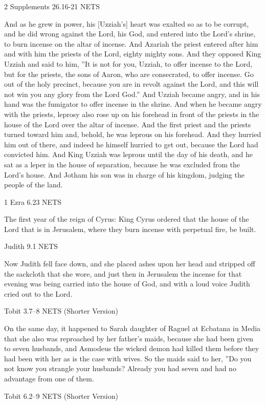 \documentclass[
]{article}
\newcommand{\RL}[1]{\beginR #1\endR}
\begin{document}
2 Supplements 26.16-21 NETS

And as he grew in power, his {[}Uzziah's{]} heart was exalted so as to
be corrupt, and he did wrong against the Lord, his God, and entered into
the Lord\RL{'}s shrine, to burn incense on the altar of incense. And
Azariah the priest entered after him and with him the priests of the
Lord, eighty mighty sons. And they opposed King Uzziah and said to him,
\RL{''}It is not for you, Uzziah, to offer incense to the Lord, but for
the priests, the sons of Aaron, who are consecrated, to offer incense.
Go out of the holy precinct, because you are in revolt against the Lord,
and this will not win you any glory from the Lord God.'' And Uzziah
became angry, and in his hand was the fumigator to offer incense in the
shrine. And when he became angry with the priests, leprosy also rose up
on his forehead in front of the priests in the house of the Lord over
the altar of incense. And the first priest and the priests turned toward
him and, behold, he was leprous on his forehead. And they hurried him
out of there, and indeed he himself hurried to get out, because the Lord
had convicted him. And King Uzziah was leprous until the day of his
death, and he sat as a leper in the house of separation, because he was
excluded from the Lord\RL{'}s house. And Jotham his son was in charge of
his kingdom, judging the people of the land.

1 Ezra 6.23 NETS

The first year of the reign of Cyrus: King Cyrus ordered that the house
of the Lord that is in Jerusalem, where they burn incense with perpetual
fire, be built.

Judith 9.1 NETS

Now Judith fell face down, and she placed ashes upon her head and
stripped off the sackcloth that she wore, and just then in Jerusalem the
incense for that evening was being carried into the house of God, and
with a loud voice Judith cried out to the Lord.

Tobit 3.7--8 NETS (Shorter Version)

On the same day, it happened to Sarah daughter of Raguel at Ecbatana in
Media that she also was reproached by her father\RL{'}s maids, because
she had been given to seven husbands, and Asmodeus the wicked demon had
killed them before they had been with her as is the case with wives. So
the maids said to her, \RL{''}Do you not know you strangle your
husbands? Already you had seven and had no advantage from one of them.

Tobit 6.2--9 NETS (Shorter Version)
\end{document}
